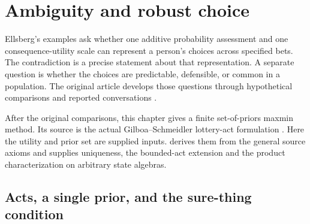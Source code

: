 \chapter{Ambiguity and robust choice}
\label{sec:p17-ambiguity-and-robust-choice}

Ellsberg's examples ask whether one additive probability assessment
and one consequence-utility scale can represent a person's choices
across specified bets. The contradiction is a precise statement about
that representation. A separate question is whether the choices are
predictable, defensible, or common in a population.
The original article develops those questions through hypothetical
comparisons and reported conversations
\cite[pp.~643--669]{Ellsberg1961Ambiguity}.

After the original comparisons, this chapter gives a finite
set-of-priors maxmin method. Its source is the actual
Gilboa--Schmeidler lottery-act formulation
\cite[pp.~141--145]{GilboaSchmeidler1989Maxmin}.
Here the utility and prior set are supplied inputs.
 derives them from the
general source axioms and supplies uniqueness, the bounded-act
extension and the product characterization on arbitrary state algebras.

\section{Acts, a single prior, and the sure-thing condition}

